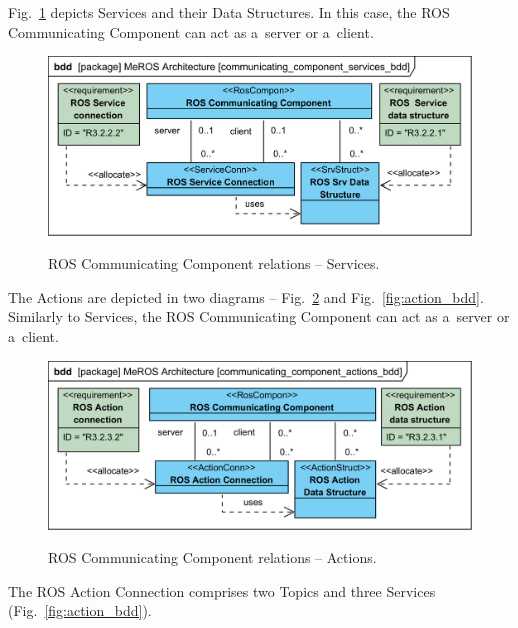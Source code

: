 \documentclass[11pt,oneside,a4paper]{report}
\begin{document}
	\pagebreak
	
	Fig.~\ref{fig:communication_blocks_services_bdd} depicts Services and their Data Structures. In this case, the ROS Communicating Component can act as a~server or a~client.	
	
		
	\begin{figure}[H]
		\centering
		\begin{center}
			{\includegraphics[scale=1.0]{diagrams/communicating_component_services_bdd.png}}
		\end{center}
		\caption{ROS Communicating Component relations -- Services.} 
		\label{fig:communication_blocks_services_bdd}
	\end{figure}
		
	The Actions are depicted in two diagrams -- Fig.~\ref{fig:communicating_component_actions_bdd} and Fig.~\ref{fig:action_bdd}. Similarly to Services, the ROS Communicating Component can act as a~server or a~client.	 
	
	
	\begin{figure}[H]
		\centering
		\begin{center}
			{\includegraphics[scale=1.0]{diagrams/communicating_component_actions_bdd.png}}
		\end{center}
		\caption{ROS Communicating Component relations -- Actions.} 
		\label{fig:communicating_component_actions_bdd}
	\end{figure}
	
	The ROS Action Connection comprises two Topics and three Services (Fig.~\ref{fig:action_bdd}).
	
\end{document}
